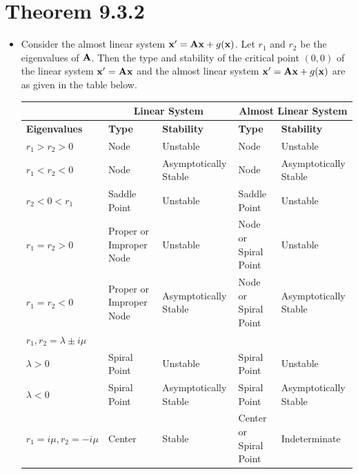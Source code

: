 \documentclass[11pt,a4paper]{article}
\begin{document}
	\section*{Theorem 9.3.2}
	\begin{itemize}
		\item Consider the almost linear system $\vb{x}^\prime = \vb{Ax} + g(\vb{x})$. Let $r_1$ and $r_2$ be the eigenvalues of $\vb{A}$. Then the type and stability of the critical point $(0,0)$ of the linear system $\vb{x}^\prime = \vb{Ax}$ and the almost linear system $\vb{x}^\prime = \vb{Ax} + g(\vb{x})$ are as given in the table below.
		\begin{table}[H]
			\begin{adjustbox}{width=\columnwidth,center}
			\begin{tabular}{ |l|l|l|l|l| } 
				\hline
				& \multicolumn{2}{|c|}{Linear System} & \multicolumn{2}{|c|}{Almost Linear System}\\
				\hline
				\textbf{Eigenvalues}&\textbf{Type}&\textbf{Stability}&\textbf{Type}&\textbf{Stability}\\
				\hline
				$r_1>r_2>0$ & Node & Unstable & Node & Unstable\\
				\hline
				$r_1 < r_2 < 0$ & Node & Asymptotically Stable & Node & Asymptotically Stable\\
				\hline
				$r_2 < 0 < r_1$ & Saddle Point & Unstable & Saddle Point & Unstable\\ 
				\hline
				$r_1 = r_2 > 0$ & Proper or Improper Node & Unstable & Node or Spiral Point & Unstable\\
				\hline
				$r_1 = r_2 < 0$ & Proper or Improper Node & Asymptotically Stable & Node or Spiral Point & Asymptotically Stable\\
				\hline
				$r_1,r_2 = \lambda \pm i\mu$ & & & &\\
				\hline
				$\lambda > 0$ & Spiral Point & Unstable & Spiral Point & Unstable\\
				\hline
				$\lambda < 0$ & Spiral Point & Asymptotically Stable & Spiral Point & Asymptotically Stable\\
				\hline
				$r_1 = i\mu, r_2 = -i\mu$ & Center & Stable & Center or Spiral Point & Indeterminate\\
				\hline
			\end{tabular}
			\end{adjustbox}
		\end{table}
	\end{itemize}
\end{document}
